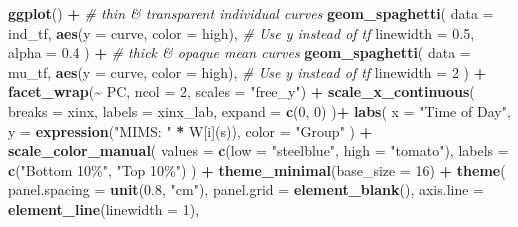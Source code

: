 \documentclass[
]{article}
\newenvironment{Shaded}{\begin{snugshade}}{\end{snugshade}}
\newcommand{\AttributeTok}[1]{\textcolor[rgb]{0.13,0.29,0.53}{#1}}
\newcommand{\CommentTok}[1]{\textcolor[rgb]{0.56,0.35,0.01}{\textit{#1}}}
\newcommand{\DecValTok}[1]{\textcolor[rgb]{0.00,0.00,0.81}{#1}}
\newcommand{\FloatTok}[1]{\textcolor[rgb]{0.00,0.00,0.81}{#1}}
\newcommand{\FunctionTok}[1]{\textcolor[rgb]{0.13,0.29,0.53}{\textbf{#1}}}
\newcommand{\NormalTok}[1]{#1}
\newcommand{\SpecialCharTok}[1]{\textcolor[rgb]{0.81,0.36,0.00}{\textbf{#1}}}
\newcommand{\StringTok}[1]{\textcolor[rgb]{0.31,0.60,0.02}{#1}}
\begin{document}
\begin{Shaded}
\begin{Highlighting}[]
\FunctionTok{ggplot}\NormalTok{() }\SpecialCharTok{+}
  \CommentTok{\# thin \& transparent individual curves}
  \FunctionTok{geom\_spaghetti}\NormalTok{(}
    \AttributeTok{data      =}\NormalTok{ ind\_tf,}
    \FunctionTok{aes}\NormalTok{(}\AttributeTok{y =}\NormalTok{ curve, }\AttributeTok{color =}\NormalTok{ high),  }\CommentTok{\# Use \textquotesingle{}y\textquotesingle{} instead of \textquotesingle{}tf\textquotesingle{}}
    \AttributeTok{linewidth =} \FloatTok{0.5}\NormalTok{,}
    \AttributeTok{alpha     =} \FloatTok{0.4}
\NormalTok{  ) }\SpecialCharTok{+}
  \CommentTok{\# thick \& opaque mean curves}
  \FunctionTok{geom\_spaghetti}\NormalTok{(}
    \AttributeTok{data      =}\NormalTok{ mu\_tf,}
    \FunctionTok{aes}\NormalTok{(}\AttributeTok{y =}\NormalTok{ curve, }\AttributeTok{color =}\NormalTok{ high),  }\CommentTok{\# Use \textquotesingle{}y\textquotesingle{} instead of \textquotesingle{}tf\textquotesingle{}}
    \AttributeTok{linewidth =} \DecValTok{2}
\NormalTok{  ) }\SpecialCharTok{+}
  \FunctionTok{facet\_wrap}\NormalTok{(}\SpecialCharTok{\textasciitilde{}}\NormalTok{ PC, }\AttributeTok{ncol =} \DecValTok{2}\NormalTok{, }\AttributeTok{scales =} \StringTok{"free\_y"}\NormalTok{) }\SpecialCharTok{+}
  \FunctionTok{scale\_x\_continuous}\NormalTok{(}
    \AttributeTok{breaks =}\NormalTok{ xinx,}
    \AttributeTok{labels =}\NormalTok{ xinx\_lab,}
    \AttributeTok{expand =} \FunctionTok{c}\NormalTok{(}\DecValTok{0}\NormalTok{, }\DecValTok{0}\NormalTok{)}
\NormalTok{  )}\SpecialCharTok{+}
  \FunctionTok{labs}\NormalTok{(}
    \AttributeTok{x     =} \StringTok{"Time of Day"}\NormalTok{,}
    \AttributeTok{y     =} \FunctionTok{expression}\NormalTok{(}\StringTok{"MIMS: "} \SpecialCharTok{*}\NormalTok{ W[i](s)),}
    \AttributeTok{color =} \StringTok{"Group"}
\NormalTok{  ) }\SpecialCharTok{+}
  \FunctionTok{scale\_color\_manual}\NormalTok{(}
    \AttributeTok{values =} \FunctionTok{c}\NormalTok{(}\AttributeTok{low =} \StringTok{"steelblue"}\NormalTok{, }\AttributeTok{high =} \StringTok{"tomato"}\NormalTok{),}
    \AttributeTok{labels =} \FunctionTok{c}\NormalTok{(}\StringTok{"Bottom 10\%"}\NormalTok{, }\StringTok{"Top 10\%"}\NormalTok{)}
\NormalTok{  ) }\SpecialCharTok{+}
  \FunctionTok{theme\_minimal}\NormalTok{(}\AttributeTok{base\_size =} \DecValTok{16}\NormalTok{) }\SpecialCharTok{+}
  \FunctionTok{theme}\NormalTok{(}
    \AttributeTok{panel.spacing    =} \FunctionTok{unit}\NormalTok{(}\FloatTok{0.8}\NormalTok{, }\StringTok{"cm"}\NormalTok{),}
    \AttributeTok{panel.grid       =} \FunctionTok{element\_blank}\NormalTok{(),}
    \AttributeTok{axis.line        =} \FunctionTok{element\_line}\NormalTok{(}\AttributeTok{linewidth =} \DecValTok{1}\NormalTok{),}

\end{Highlighting}
\end{Shaded}
\end{document}
